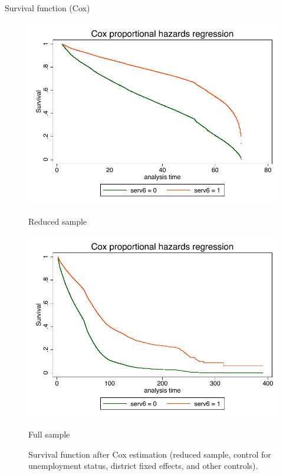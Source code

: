 \documentclass{beamer}
\begin{document}
\begin{frame}{Survival function (Cox)}
\begin{figure}[ht]
        \begin{minipage}[b]{0.45\linewidth}
            \centering
            \includegraphics[width=\textwidth]{images/surv_cos.pdf}
            \caption{Reduced sample}
        \end{minipage}
        \hspace{0.5cm}
        \begin{minipage}[b]{0.45\linewidth}
            \centering
            \includegraphics[width=\textwidth]{images/surv_cos_full.pdf}
            \caption{Full sample}
        \end{minipage}
    \caption{Survival function after Cox estimation (reduced sample, control for unemployment status, district fixed effects, and other controls).}
    \end{figure}

\end{frame}
\end{document}
